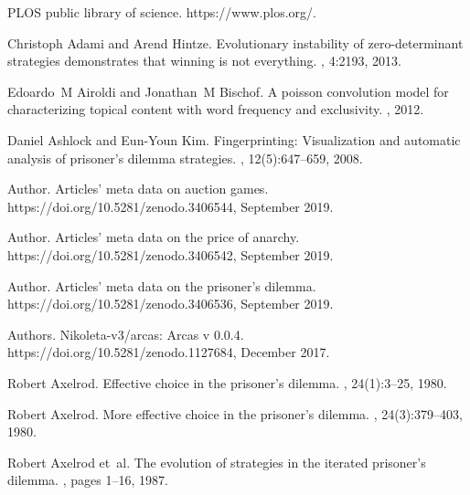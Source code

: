 \documentclass{article}
\theoremstyle{definition}
\begin{document}
\begin{thebibliography}{10}

    {PLOS} public library of science.
    \newblock https://www.plos.org/.
    
    Christoph Adami and Arend Hintze.
    \newblock Evolutionary instability of zero-determinant strategies demonstrates
      that winning is not everything.
    , 4:2193, 2013.
    
    Edoardo~M Airoldi and Jonathan~M Bischof.
    \newblock A poisson convolution model for characterizing topical content with
      word frequency and exclusivity.
    , 2012.
    
    Daniel Ashlock and Eun-Youn Kim.
    \newblock Fingerprinting: Visualization and automatic analysis of prisoner's
      dilemma strategies.
    , 12(5):647--659,
      2008.
    
    Author.
    \newblock Articles' meta data on auction games.
    \newblock https://doi.org/10.5281/zenodo.3406544, September 2019.
    
    Author.
    \newblock Articles' meta data on the price of anarchy.
    \newblock https://doi.org/10.5281/zenodo.3406542, September 2019.
    
    Author.
    \newblock Articles' meta data on the prisoner's dilemma.
    \newblock https://doi.org/10.5281/zenodo.3406536, September 2019.
    
    Authors.
    \newblock Nikoleta-v3/arcas: Arcas v 0.0.4.
    \newblock https://doi.org/10.5281/zenodo.1127684, December 2017.
    
    Robert Axelrod.
    \newblock Effective choice in the prisoner's dilemma.
    , 24(1):3--25, 1980.
    
    Robert Axelrod.
    \newblock More effective choice in the prisoner's dilemma.
    , 24(3):379--403, 1980.
    
    Robert Axelrod et~al.
    \newblock The evolution of strategies in the iterated prisoner’s dilemma.
    , pages 1--16, 1987.
    

\end{thebibliography}
\end{document}
